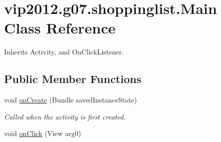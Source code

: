 \hypertarget{classvip2012_1_1g07_1_1shoppinglist_1_1Main}{\section{vip2012.\-g07.\-shoppinglist.\-Main Class Reference}
\label{classvip2012_1_1g07_1_1shoppinglist_1_1Main}
}


Inherits Activity, and On\-Click\-Listener.

\subsection*{Public Member Functions}
\begin{DoxyCompactItemize}
\item 
void \hyperlink{classvip2012_1_1g07_1_1shoppinglist_1_1Main_aef8afba4937dce29fd866ff57f9e937f}{on\-Create} (Bundle saved\-Instance\-State)
\begin{DoxyCompactList}\small\item\em Called when the activity is first created. \end{DoxyCompactList}\item 
void \hyperlink{classvip2012_1_1g07_1_1shoppinglist_1_1Main_aee5a22657cfcd2c0edb3ea648d9ed6fc}{on\-Click} (View arg0)
\end{DoxyCompactItemize}


